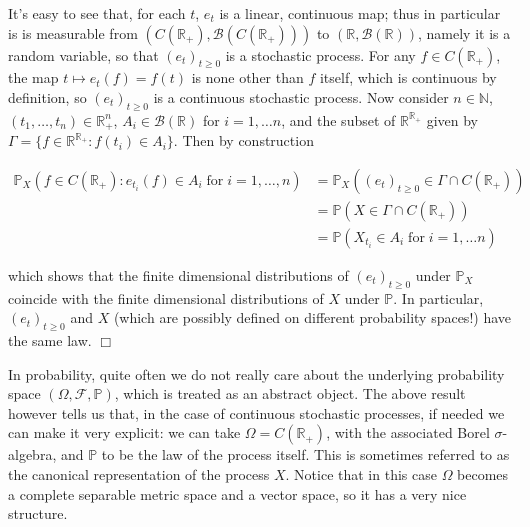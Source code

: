 \documentclass{article}
\newcommand{\textbf}[1]{\text{{\bfseries{#1}}}}
\newenvironment{proof}{\noindent\textbf{Proof\ }}{\hspace*{\fill}$\Box$\medskip}
\newcommand{\1}{\1}
\begin{document}
{\begin{proof}
  It's easy to see that, for each $t$, $e_t$ is a linear, continuous map; thus
  in particular is is measurable from $(C (\mathbb{R}_+), \mathcal{B} (C
  (\mathbb{R}_+)))$ to $(\mathbb{R}, \mathcal{B} (\mathbb{R}))$, namely it is
  a random variable, so that $(e_t)_{t \geqslant 0}$ is a stochastic process.
  For any $f \in C (\mathbb{R}_+)$, the map $t \mapsto e_t (f) = f (t)$ is
  none other than $f$ itself, which is continuous by definition, so $(e_t)_{t
  \geqslant 0}$ is a continuous stochastic process. Now consider $n \in
  \mathbb{N}$, $(t_1, \ldots, t_n) \in \mathbb{R}_+^n$, $A_i \in \mathcal{B}
  (\mathbb{R})$ for $i = 1, \ldots n$, and the subset of
  $\mathbb{R}^{\mathbb{R}_+}$ given by $\Gamma = \{ f \in
  \mathbb{R}^{\mathbb{R}_+} : f (t_i) \in A_i \}$. Then by construction
  
  \begin{align*}
    \mathbb{P}_X (f \in C (\mathbb{R}_+) : e_{t_i} (f) \in A_i \operatorname{for} i =
    1, \ldots, n) & =\mathbb{P}_X ((e_t)_{t \geqslant 0} \in \Gamma \cap C
    (\mathbb{R}_+))\\
    & =\mathbb{P} (X \in \Gamma \cap C (\mathbb{R}_+))\\
    & =\mathbb{P} (X_{t_i} \in A_i \operatorname{for} i = 1, \ldots n)
  \end{align*}
  
  which shows that the finite dimensional distributions of $(e_t)_{t \geqslant
  0}$ under $\mathbb{P}_X$ coincide with the finite dimensional distributions
  of $X$ under $\mathbb{P}$. In particular, $(e_t)_{t \geqslant 0}$ and $X$
  (which are possibly defined on different probability spaces!) have the same
  law.
\end{proof}

In probability, quite often we do not really care about the underlying
probability space $(\Omega, \mathcal{F}, \mathbb{P})$, which is treated as an
abstract object. The above result however tells us that, in the case of
continuous stochastic processes, if needed we can make it very explicit: we
can take $\Omega = C (\mathbb{R}_+)$, with the associated Borel
$\sigma$-algebra, and $\mathbb{P}$ to be the law of the process itself. This
is sometimes referred to as the canonical representation of the
process $X$. Notice that in this case $\Omega$ becomes a complete separable
metric space and a vector space, so it has a very nice structure.

\

}
\end{document}
